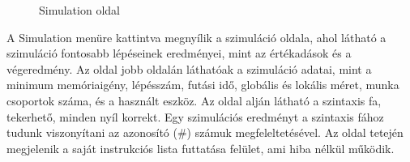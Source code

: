 \begin{figure}[h]
\centering
{}
\caption{Simulation oldal}
\label{fig:sim}
\end{figure}


A Simulation menüre kattintva megnyílik a szimuláció oldala, ahol látható a szimuláció fontosabb lépéseinek eredményei, mint az értékadások és a végeredmény. Az oldal jobb oldalán láthatóak a szimuláció adatai, mint a minimum memóriaigény, lépésszám, futási idő, globális és lokális méret, munka csoportok száma, és a használt eszköz. Az oldal alján látható a szintaxis fa, tekerhető, minden nyíl korrekt. Egy szimulációs eredményt a szintaxis fához tudunk viszonyítani az azonosító (\#) számuk megfeleltetésével.
Az oldal tetején megjelenik a saját instrukciós lista futtatása felület, ami hiba nélkül működik.